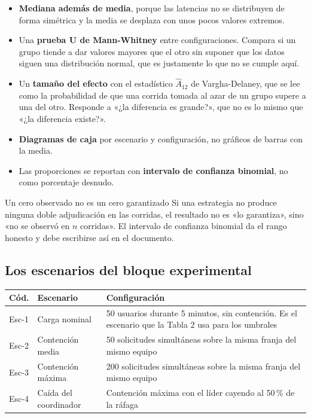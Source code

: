 \documentclass[11pt,a4paper]{article}
\begin{document}
\begin{itemize}[leftmargin=*,itemsep=4pt]
	\item \textbf{Mediana además de media}, porque las latencias no se distribuyen de forma simétrica y la media se desplaza con unos pocos valores extremos.
	\item Una \textbf{prueba U de Mann-Whitney} entre configuraciones. Compara si un grupo tiende a dar valores mayores que el otro sin suponer que los datos siguen una distribución normal, que es justamente lo que no se cumple aquí.
	\item Un \textbf{tamaño del efecto} con el estadístico $\hat{A}_{12}$ de Vargha-Delaney, que se lee como la probabilidad de que una corrida tomada al azar de un grupo supere a una del otro. Responde a «¿la diferencia es grande?», que no es lo mismo que «¿la diferencia existe?».
	\item \textbf{Diagramas de caja} por escenario y configuración, no gráficos de barras con la media.
	\item Las proporciones se reportan con \textbf{intervalo de confianza binomial}, no como porcentaje desnudo.
\end{itemize}

\begin{avisoBox}{Un cero observado no es un cero garantizado}
	Si una estrategia no produce ninguna doble adjudicación en las corridas, el resultado no es «lo garantiza», sino «no se observó en $n$ corridas». El intervalo de confianza binomial da el rango honesto y debe escribirse así en el documento.
\end{avisoBox}

\subsection{Los escenarios del bloque experimental}

\begin{center}
	\small
	\begin{tabular}{@{}p{1.3cm}p{5.4cm}p{8.3cm}@{}}
		\toprule
		\textbf{Cód.} & \textbf{Escenario} & \textbf{Configuración} \\
		\midrule
		Esc-1 & Carga nominal & 50 usuarios durante 5 minutos, sin contención. Es el escenario que la Tabla 2 usa para los umbrales \\
		\addlinespace
		Esc-2 & Contención media & 50 solicitudes simultáneas sobre la misma franja del mismo equipo \\
		\addlinespace
		Esc-3 & Contención máxima & 200 solicitudes simultáneas sobre la misma franja del mismo equipo \\
		\addlinespace
		Esc-4 & Caída del coordinador & Contención máxima con el líder cayendo al 50\,\% de la ráfaga \\
		\bottomrule
	\end{tabular}
\end{center}
\end{document}
